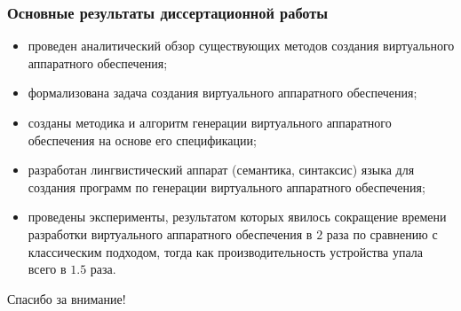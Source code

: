 \begin{frame}%
    \frametitle{Основные результаты диссертационной работы}
    \begin{itemize}
        \item проведен аналитический обзор существующих методов создания виртуального аппаратного обеспечения;
        \item формализована задача создания виртуального аппаратного обеспечения;
        \item созданы методика и алгоритм генерации виртуального аппаратного обеспечения на основе его спецификации;
        \item разработан лингвистический аппарат (семантика, синтаксис) языка для создания программ по генерации виртуального
            аппаратного обеспечения;
        \item проведены эксперименты, результатом которых явилось сокращение времени разработки
            виртуального аппаратного обеспечения в $2$ раза по сравнению с классическим
            подходом, тогда как производительность устройства упала всего в $1.5$ раза.
    \end{itemize}
\end{frame}


\begin{frame}%
    \begin{center}
        \Huge Спасибо за внимание!
    \end{center}
\end{frame}
